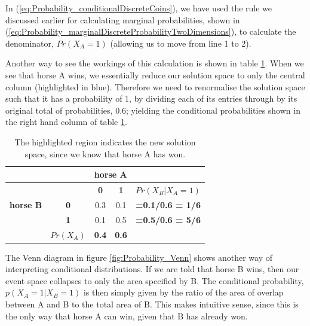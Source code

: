 \documentclass[11pt,fullpage]{book}
\begin{document}
In (\ref{eq:Probability_conditionalDiscreteCoins}), we have used the rule we discussed earlier for calculating marginal probabilities, shown in (\ref{eq:Probability_marginalDiscreteProbabilityTwoDimensions}), to calculate the denominator, $Pr(X_A=1)$ (allowing us to move from line 1 to 2).

Another way to see the workings of this calculation is shown in table \ref{tab:Probability_coinsConditionalDiscrete}. When we see that horse A wins, we essentially reduce our solution space to only the central column (highlighted in blue). Therefore we need to renormalise the solution space such that it has a probability of 1, by dividing each of its entries through by its original total of probabilities, 0.6; yielding the conditional probabilities shown in the right hand column of table \ref{tab:Probability_coinsConditionalDiscrete}.

\begin{table}[htbp]
  \centering
    \begin{tabular}{rrccr}
    \toprule
          &       & \multicolumn{2}{c}{\textbf{horse A}} &  \\
    \midrule
          &       & \textbf{0} & \textbf{1} & \multicolumn{1}{c}{\textbf{$Pr(X_B|X_A=1)$}} \\
    \multicolumn{1}{c}{\textbf{horse B}} & \multicolumn{1}{c}{\textbf{0}} & 0.3   & {\color{blue}0.1}   & \multicolumn{1}{c}{\textbf{=0.1/0.6 = 1/6}} \\
    \multicolumn{1}{c}{} & \multicolumn{1}{c}{\textbf{1}} & 0.1   & {\color{blue}0.5}   & \multicolumn{1}{c}{\textbf{=0.5/0.6 = 5/6}} \\
          & \multicolumn{1}{c}{\textbf{$Pr(X_A)$}} & \textbf{0.4} & {\color{blue}\textbf{0.6}} & \multicolumn{1}{c}{} \\
    \bottomrule
    \end{tabular}%
\caption{The highlighted region indicates the new solution space, since we know that horse A has won.}
\label{tab:Probability_coinsConditionalDiscrete}
\end{table}

The Venn diagram in figure \ref{fig:Probability_Venn} shows another way of interpreting conditional distributions. If we are told that horse B wins, then our event space collapses to only the area specified by B. The conditional probability, $p(X_A=1|X_B=1)$ is then simply given by the ratio of the area of overlap between A and B to the total area of B. This makes intuitive sense, since this is the only way that horse A can win, given that B has already won.
\end{document}
